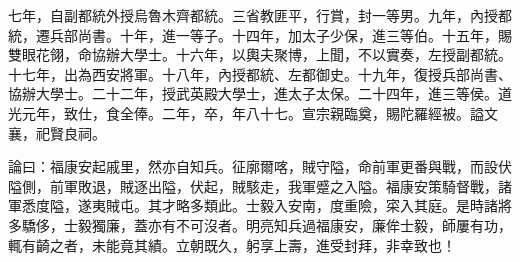 \begin{pinyinscope}
七年，自副都統外授烏魯木齊都統。三省教匪平，行賞，封一等男。九年，內授都統，遷兵部尚書。十年，進一等子。十四年，加太子少保，進三等伯。十五年，賜雙眼花翎，命協辦大學士。十六年，以輿夫聚博，上聞，不以實奏，左授副都統。十七年，出為西安將軍。十八年，內授都統、左都御史。十九年，復授兵部尚書、協辦大學士。二十二年，授武英殿大學士，進太子太保。二十四年，進三等侯。道光元年，致仕，食全俸。二年，卒，年八十七。宣宗親臨奠，賜陀羅經被。謚文襄，祀賢良祠。

論曰：福康安起戚里，然亦自知兵。征廓爾喀，賊守隘，命前軍更番與戰，而設伏隘側，前軍敗退，賊逐出隘，伏起，賊駭走，我軍蹙之入隘。福康安策騎督戰，諸軍悉度隘，遂夷賊屯。其才略多類此。士毅入安南，度重險，寀入其庭。是時諸將多驕侈，士毅獨廉，蓋亦有不可沒者。明亮知兵過福康安，廉侔士毅，師屢有功，輒有齮之者，未能竟其績。立朝既久，躬享上壽，進受封拜，非幸致也！


\end{pinyinscope}